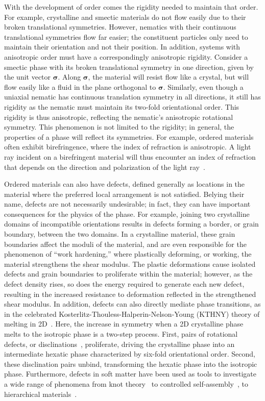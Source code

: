 With the development of order comes the rigidity needed to maintain that order.
For example, crystalline and smectic materials do not flow easily due to their broken translational symmetries.
However, nematics with their continuous translational symmetries flow far easier; the constituent particles only need to maintain their orientation and not their position.
In addition, systems with anisotropic order must have a correspondingly anisotropic rigidity.
Consider a smectic phase with its broken translational symmetry in one direction, given by the unit vector $\bm{\sigma}$.
Along $\bm{\sigma}$, the material will resist flow like a crystal, but will flow easily like a fluid in the plane orthogonal to $\bm{\sigma}$.
Similarly, even though a uniaxial nematic has continuous translation symmetry in all directions, it still has rigidity as the nematic must maintain its two-fold orientational order.
This rigidity is thus anisotropic, reflecting the nematic's anisotropic rotational symmetry.
This phenomenon is not limited to the rigidity; in general, the properties of a phase will reflect its symmetries.
For example, ordered materials often exhibit birefringence, where the index of refraction is anisotropic.
A light ray incident on a birefringent material will thus encounter an index of refraction that depends on the direction and polarization of the light ray~\cite{RN175}.

Ordered materials can also have defects, defined generally as locations in the material where the preferred local arrangement is not satisfied.
Belying their name, defects are not necessarily undesirable; in fact, they can have important consequences for the physics of the phase.
For example, joining two crystalline domains of incompatible orientations results in defects forming a border, or grain boundary, between the two domains.
In a crystalline material, these grain boundaries affect the moduli of the material, and are even responsible for the phenomenon of ``work hardening,'' where plastically deforming, or working, the material strengthens the shear modulus.
The plastic deformations cause isolated defects and grain boundaries to proliferate within the material; however, as the defect density rises, so does the energy required to generate each new defect, resulting in the increased resistance to deformation reflected in the strengthened shear modulus.
In addition, defects can also directly mediate phase transitions, as in the celebrated Kosterlitz-Thouless-Halperin-Nelson-Young (KTHNY) theory of melting in 2D~\cite{RN161,RN162,RN163}.
Here, the increase in symmetry when a 2D crystalline phase melts to the isotropic phase is a two-step process.
First, pairs of rotational defects, or disclinations~\cite{RN61,RN203}, proliferate, driving the crystalline phase into an intermediate hexatic phase characterized by six-fold orientational order.
Second, these disclination pairs unbind, transforming the hexatic phase into the isotropic phase.
Furthermore, defects in soft matter have been used as tools to investigate a wide range of phenomena from knot theory~\cite{RN156,RN277} to controlled self-assembly~\cite{RN43,RN50,RN150,RN157}, to hierarchical materials~\cite{RN164,RN159,RN27}.


